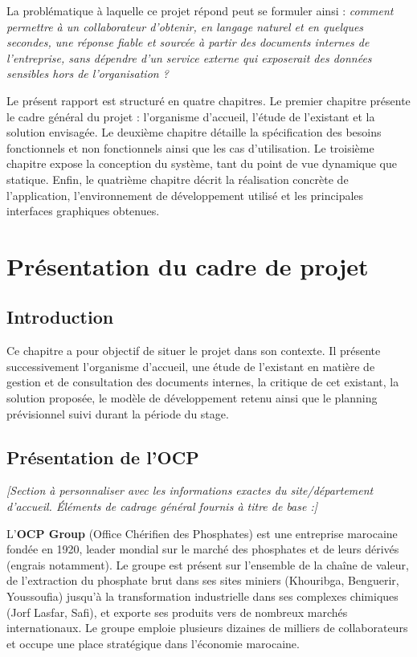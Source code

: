 \documentclass[12pt,a4paper]{report}
\newcommand{\note}[1]{\textit{[#1]}}
\begin{document}
La problématique à laquelle ce projet répond peut se formuler ainsi : \textit{comment permettre à un collaborateur d'obtenir, en langage naturel et en quelques secondes, une réponse fiable et sourcée à partir des documents internes de l'entreprise, sans dépendre d'un service externe qui exposerait des données sensibles hors de l'organisation ?}

Le présent rapport est structuré en quatre chapitres. Le premier chapitre présente le cadre général du projet : l'organisme d'accueil, l'étude de l'existant et la solution envisagée. Le deuxième chapitre détaille la spécification des besoins fonctionnels et non fonctionnels ainsi que les cas d'utilisation. Le troisième chapitre expose la conception du système, tant du point de vue dynamique que statique. Enfin, le quatrième chapitre décrit la réalisation concrète de l'application, l'environnement de développement utilisé et les principales interfaces graphiques obtenues.

\chapter{Présentation du cadre de projet}

\section{Introduction}
Ce chapitre a pour objectif de situer le projet dans son contexte. Il présente successivement l'organisme d'accueil, une étude de l'existant en matière de gestion et de consultation des documents internes, la critique de cet existant, la solution proposée, le modèle de développement retenu ainsi que le planning prévisionnel suivi durant la période du stage.

\section{Présentation de l'OCP}
\note{Section à personnaliser avec les informations exactes du site/département d'accueil. Éléments de cadrage général fournis à titre de base :}

L'\textbf{OCP Group} (Office Chérifien des Phosphates) est une entreprise marocaine fondée en 1920, leader mondial sur le marché des phosphates et de leurs dérivés (engrais notamment). Le groupe est présent sur l'ensemble de la chaîne de valeur, de l'extraction du phosphate brut dans ses sites miniers (Khouribga, Benguerir, Youssoufia) jusqu'à la transformation industrielle dans ses complexes chimiques (Jorf Lasfar, Safi), et exporte ses produits vers de nombreux marchés internationaux. Le groupe emploie plusieurs dizaines de milliers de collaborateurs et occupe une place stratégique dans l'économie marocaine.
\end{document}
